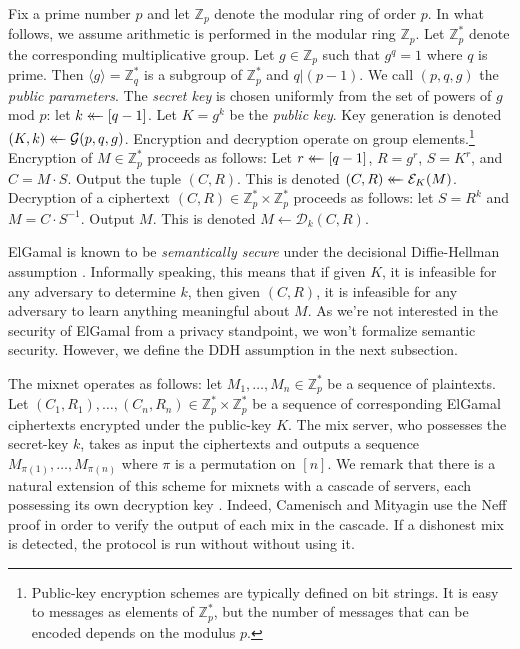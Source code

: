 \documentclass[letter]{article}
\newcounter{foot}
\newcommand{\Zmodp}{\mathbb{Z}_p}
\newcommand{\Zmodq}{\mathbb{Z}_q}
\newcommand*\by{\times}
\newcommand{\getsr}{\mathrel{\leftarrow\mkern-14mu\leftarrow}}
\newcommand{\brackets}[1]{\langle #1 \rangle}
\newcommand{\pk}{K}
\newcommand{\sk}{k}
\newcommand{\varm}{M}
\newcommand{\varc}{C}
\newcommand{\varr}{R}
\newcommand{\gen}{\mathcal{G}}
\newcommand{\enc}{\mathcal{E}}
\newcommand{\dec}{\mathcal{D}}
\begin{document}
Fix a prime number $p$ and let $\Zmodp$ denote the modular ring of order $p$.
In what follows, we assume arithmetic is performed in the modular ring $\Zmodp$.
Let $\Zmodp^*$ denote the corresponding multiplicative group.
Let $g \in \Zmodp$ such that $g^q = 1$ where $q$ is prime. Then $\brackets{g} =
\Zmodq^*$ is a subgroup of $\Zmodp^*$ and $q | (p-1)$. We call $(p, q, g)$ the
\textit{public parameters}. The \textit{secret key} is chosen uniformly from
the set of powers of $g$ mod $p$: let $\sk \getsr [q-1]$. Let $\pk = g^\sk$ be
the \textit{public key}. Key generation is denoted $(K, k) \getsr \gen(p, q,
g)$.
Encryption and decryption operate on group elements.\footnote{
Public-key encryption schemes are typically defined on bit
strings. It is easy to messages as elements of $\Zmodp^*$, but the number of
messages that can be encoded depends on the modulus $p$.}
Encryption of $M \in \Zmodp^*$ proceeds as follows:
Let $r \getsr [q-1]$,
$R = g^r$,
$S = K^r$, and
$C = M \cdot S$.
Output the tuple $(C, R)$.
This is denoted $(C, R) \getsr \enc_K(M)$.
Decryption of a ciphertext $(C, R) \in \Zmodp^* \by \Zmodp^*$ proceeds as follows:
let $S = R^\sk$ and
$M = C \cdot S^{-1}$.
Output $M$.
This is denoted $M \gets \dec_k(C, R)$.

ElGamal is known to be \textit{semantically secure} under the
decisional Diffie-Hellman assumption \cite{elgamal84,ty98}. Informally speaking, this
means that if given $\pk$, it is infeasible for any adversary to determine
$\sk$, then given $(C,R)$, it is infeasible for any adversary to
learn anything meaningful about $M$. As we're not
interested in the security of ElGamal from a privacy standpoint, we won't
formalize semantic security. However, we define the DDH assumption in the next
subsection.

The mixnet operates as follows:
let $\varm_1, \ldots, \varm_n \in \Zmodp^*$ be a sequence of plaintexts.
Let $(\varc_1, \varr_1), \ldots, (\varc_n, \varr_n) \in \Zmodp^* \by \Zmodp^*$ be a
sequence of corresponding ElGamal ciphertexts encrypted under the public-key
$\pk$. The mix server, who possesses the secret-key $\sk$, takes as input
the ciphertexts and outputs a sequence $\varm_{\pi(1)}, \ldots, \varm_{\pi(n)}$
where $\pi$ is a permutation on $[n]$.
We remark that there is a natural extension of this scheme for mixnets with a
cascade of servers, each possessing its own decryption key \cite{cm06}. Indeed,
Camenisch and Mityagin use the Neff proof in order to verify the output of each
mix in the cascade. If a dishonest mix is detected, the protocol is run without
without using it.
\end{document}

